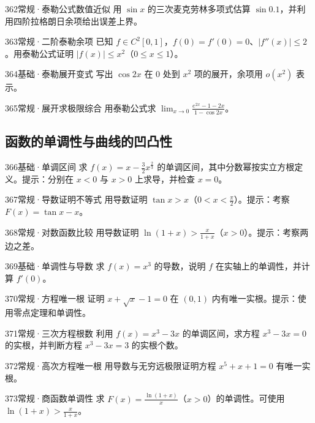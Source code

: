 \begin{exercise}{362}{常规·泰勒公式数值近似}
用 $\sin x$ 的三次麦克劳林多项式估算 $\sin0.1$，并利用四阶拉格朗日余项给出误差上界。
\end{exercise}
\begin{exercise}{363}{常规·二阶泰勒余项}
已知 $f\in C^2[0,1]$，$f(0)=f'(0)=0$、$|f''(x)|\le2$。用泰勒公式证明 $|f(x)|\le x^2$（$0\le x\le1$）。
\end{exercise}
\begin{exercise}{364}{基础·泰勒展开变式}
写出 $\cos2x$ 在 $0$ 处到 $x^2$ 项的展开，余项用 $o(x^2)$ 表示。
\end{exercise}
\begin{exercise}{365}{常规·展开求极限综合}
用泰勒公式求 $\lim_{x\to0}\frac{e^{2x}-1-2x}{1-\cos2x}$。
\end{exercise}
\subsection{函数的单调性与曲线的凹凸性}
\begin{exercise}{366}{基础·单调区间}
求 $f(x)=x-\frac32x^{\frac{2}{3}}$ 的单调区间，其中分数幂按实立方根定义。提示：分别在 $x<0$ 与 $x>0$ 上求导，并检查 $x=0$。
\end{exercise}
\begin{exercise}{367}{常规·导数证明不等式}
用导数证明 $\tan x>x$（$0<x<\frac{\pi}{2}$）。提示：考察 $F(x)=\tan x-x$。
\end{exercise}
\begin{exercise}{368}{常规·对数函数比较}
用导数证明 $\ln(1+x)>\frac{x}{1+x}$（$x>0$）。提示：考察两边之差。
\end{exercise}
\begin{exercise}{369}{基础·单调性与导数}
求 $f(x)=x^3$ 的导数，说明 $f$ 在实轴上的单调性，并计算 $f'(0)$。
\end{exercise}
\begin{exercise}{370}{常规·方程唯一根}
证明 $x+\sqrt x-1=0$ 在 $(0,1)$ 内有唯一实根。提示：使用零点定理和单调性。
\end{exercise}
\begin{exercise}{371}{常规·三次方程根数}
利用 $f(x)=x^3-3x$ 的单调区间，求方程 $x^3-3x=0$ 的实根，并判断方程 $x^3-3x=3$ 的实根个数。
\end{exercise}
\begin{exercise}{372}{常规·高次方程唯一根}
用导数与无穷远极限证明方程 $x^5+x+1=0$ 有唯一实根。
\end{exercise}
\begin{exercise}{373}{常规·商函数单调性}
求 $F(x)=\frac{\ln(1+x)}{x}$（$x>0$）的单调性。可使用 $\ln(1+x)>\frac{x}{1+x}$。
\end{exercise}
